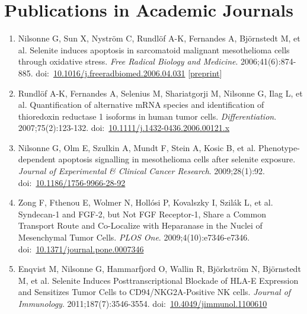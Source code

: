 \documentclass[10pt,a4paper,twocolumn]{article}
\begin{document}

\section{Publications in Academic Journals}
\begin{enumerate}

    \item Nilsonne G, Sun X, Nyström C, Rundlöf A-K, Fernandes A, Björnstedt M, et al. Selenite induces apoptosis in sarcomatoid malignant mesothelioma cells through oxidative stress. \textit{Free Radical Biology and Medicine}. 2006;41(6):874-885. doi:~\href{https://doi.org/10.1016/j.freeradbiomed.2006.04.031}{10.1016/j.freeradbiomed.2006.04.031} [\href{http://hdl.handle.net/10616/47514}{preprint}]

    \item Rundlöf A-K, Fernandes A, Selenius M, Shariatgorji M, Nilsonne G, Ilag L, et al. Quantification of alternative mRNA species and identification of thioredoxin reductase 1 isoforms in human tumor cells. \textit{Differentiation}. 2007;75(2):123-132. doi:~\href{https://doi.org/10.1111/j.1432-0436.2006.00121.x}{10.1111/j.1432-0436.2006.00121.x}

    \item Nilsonne G, Olm E, Szulkin A, Mundt F, Stein A, Kosic B, et al. Phenotype-dependent apoptosis signalling in mesothelioma cells after selenite exposure. \textit{Journal of Experimental \& Clinical Cancer Research}. 2009;28(1):92. doi:~\href{https://doi.org/10.1186/1756-9966-28-92}{10.1186/1756-9966-28-92}

    \item Zong F, Fthenou E, Wolmer N, Hollósi P, Kovalszky I, Szilák L, et al. Syndecan-1 and FGF-2, but Not FGF Receptor-1, Share a Common Transport Route and Co-Localize with Heparanase in the Nuclei of Mesenchymal Tumor Cells. \textit{PLOS One}. 2009;4(10):e7346-e7346. doi:~\href{https://doi.org/10.1371/journal.pone.0007346}{10.1371/journal.pone.0007346}

    \item Enqvist M, Nilsonne G, Hammarfjord O, Wallin R, Björkström N, Björnstedt M, et al. Selenite Induces Posttranscriptional Blockade of HLA-E Expression and Sensitizes Tumor Cells to CD94/NKG2A-Positive NK cells. \textit{Journal of Immunology}. 2011;187(7):3546-3554. doi:~\href{https://doi.org/10.4049/jimmunol.1100610}{10.4049/jimmunol.1100610}


\end{enumerate}
\end{document}
